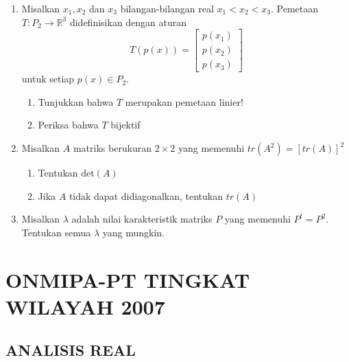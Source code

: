 \documentclass[12pt,twoside]{article}
\begin{document}
\begin{enumerate}
	\item Misalkan $x_1, x_2$ dan $x_3$ bilangan-bilangan real $x_1<x_2<x_3$. Pemetaan $T:P_2\to \mathbb{R}^3$ didefinisikan dengan aturan $$T(p(x))=\left[\begin{array}{c}
				      p(x_1) \\p(x_2)\\p(x_3)
			      \end{array}\right]$$
	      untuk setiap $p(x)\in P_2$.
	      \begin{enumerate}
		      \item[(a)] Tunjukkan bahwa  $T$ merupakan pemetaan linier!
		      \item[(b)] Periksa bahwa $T$ bijektif
	      \end{enumerate}
	\item Misalkan $A$ matriks berukuran $2\times2$ yang memenuhi $tr(A^2)=\left[ tr(A)\right]^2$
	      \begin{enumerate}
		      \item[(a)] Tentukan $\text{det}(A)$
		      \item[(b)] Jika $A$ tidak dapat didiagonalkan, tentukan $tr(A)$
	      \end{enumerate}
	\item Misalkan $\lambda$ adalah nilai karakteristik matriks $P$ yang memenuhi $P^t=P^2$. Tentukan semua $\lambda$ yang mungkin.
\end{enumerate}

\pagebreak


\section{ONMIPA-PT TINGKAT WILAYAH 2007}

\subsection{ANALISIS REAL}
\end{document}
